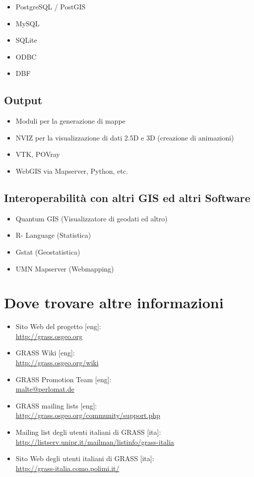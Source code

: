 \documentclass[notumble,a4paper,10pt,nofoldmark]{leaflet}
\newcommand{\GRASSurl}{\url{http://grass.osgeo.org}}
\begin{document}
\begin{itemize}
\item PostgreSQL / PostGIS
\item MySQL
\item SQLite
\item ODBC
\item DBF
\end{itemize}

\subsection{Output}

\begin{itemize}
\item Moduli per la generazione di mappe
\item NVIZ per la visualizzazione di dati 2.5D e 3D (creazione di animazioni)
\item VTK, POVray
\item WebGIS via Mapserver, Python, etc.
\end{itemize}

\subsection{Interoperabilit\`a con altri GIS ed altri Software}

\begin{itemize}
\item Quantum GIS (Visualizzatore di geodati ed altro)
\item R- Language (Statistica)
\item Gstat (Geostatistica)
\item UMN Mapserver (Webmapping)
\end{itemize}

\section{Dove trovare altre informazioni}

\begin{itemize}
\item{Sito Web del progetto [eng]: \\\GRASSurl}
\item{GRASS Wiki  [eng]: \\\url{http://grass.osgeo.org/wiki}}
\item{GRASS Promotion Team  [eng]: \\\url{malte@perlomat.de}}
\item{GRASS mailing lists  [eng]: \\\url{http://grass.osgeo.org/community/support.php}}
\item{Mailing list degli utenti italiani di GRASS  [ita]: \\\url{http://listserv.unipr.it/mailman/listinfo/grass-italia}}
\item{Sito Web degli utenti italiani di GRASS [ita]: \\\url{http://grass-italia.como.polimi.it/}}
\end{itemize}
\end{document}

